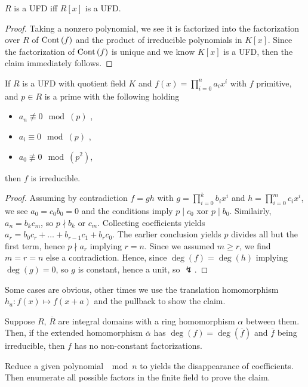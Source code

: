 \begin{theorem}
\(R\) is a UFD iff \(R\left[ x \right] \) 	is a UFD.
\end{theorem}
\begin{proof}
	Taking a nonzero polynomial, we see it is factorized into the factorization over \(R\) of \(\operatorname{Cont}\left( f \right) \) and the product of irreducible polynomials in \(K\left[ x \right] \). Since the factorization of \(\operatorname{Cont}\left( f \right) \) is unique and we know \(K\left[ x \right] \) is a UFD, then the claim immediately follows.
\end{proof}
\begin{theorem}
	If \(R\) is a UFD with quotient field \(K\) and \(f\left( x \right)  = \prod_{i=0}^{n} a_{i} x^{i} \) with \(f\) primitive, and \(p \in R\) is a prime with the following holding
	\begin{itemize}
		\item \(a_{n} \not \equiv 0 \mod\left( p \right) \) ,
		\item \(a_{i} \equiv 0 \mod\left( p \right) \) ,
		\item \(a_0 \not \equiv 0 \mod \left( p^2 \right) \),
	\end{itemize}
	then \(f\) is irreducible.
\end{theorem}
\begin{proof}
	Assuming by contradiction \(f = gh \) with \(g = \prod_{i=0}^{k} b_{i} x^{i} \) and \(h = \prod_{i=0}^{m} c_{i} x^{i} \), we see \(a_0 = c_0b_0 = 0\) and the conditions imply \(p \mid c_0\) xor \(p \mid b_0\). Similairly, \(a_{n} = b_{k} c_{m}\), so \(p \nmid b_{k} \text{ or } c_{m}\). Collecting coefficients yields \(a_{r} = b_0 c_{r} + \ldots + b_{r-1} c_1 + b_{r} c_0 \). The earlier conclusion yields \(p\) divides all but the first term, hence \(p \nmid a_{r}\) implying \(r = n\). Since we assumed \(m \ge r\), we find \(m = r = n\) else a contradiction. Hence, since \(\deg \left(  f \right) = \deg \left( h \right) \) implying \(\deg \left( g \right)  = 0\), so \(g\) is constant, hence a unit, so \(\lightning\).
\end{proof}
\begin{example}
	Some cases are obvious, other times we use the translation homomorphism \(h_{a} : f\left( x \right) \mapsto f\left( x + a \right) \) and the pullback to show the claim.
\end{example}
\begin{theorem}
	Suppose \(R\), \(\overline{R}\) are integral domains with a ring homomorphism \(\alpha\) between them. Then, if the extended homomorphism \(\overline{\alpha}\) has \(\deg \left( f \right) = \deg \left( \overline{f} \right) \) and \(\overline{f}\) being irreducible, then \(f\) has no non-constant factorizations.
\end{theorem}
\begin{example}
	Reduce a given polynomial \(\mod n\) to yields the disappearance of coefficients. Then enumerate all possible factors in the finite field to prove the claim.
\end{example}
